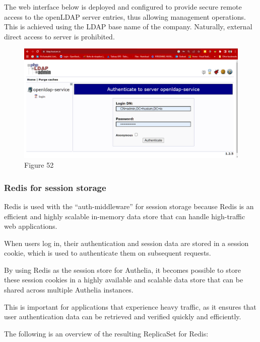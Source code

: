 
The web interface below is deployed and configured to provide secure remote access to the openLDAP server entries, thus allowing management operations. This is achieved using the LDAP base name of the company. Naturally, external direct access to server is prohibited. 
\begin{figure}[H]\centering
\includegraphics[width=1.0\textwidth,angle=00]{assets/f52.png}
\caption{Figure 52 }
\label{fig:f52}
\end{figure} 

\subsubsection{Redis for session storage }

Redis is used with the “auth-middleware” for session storage because Redis is an efficient and highly scalable in-memory data store that can handle high-traffic web applications. 


When users log in, their authentication and session data are stored in a session cookie, which is used to authenticate them on subsequent requests. 

By using Redis as the session store for Authelia, it becomes possible to store these session cookies in a highly available and scalable data store that can be shared across multiple Authelia instances.  

This is important for applications that experience heavy traffic, as it ensures that user authentication data can be retrieved and verified quickly and efficiently. 


The following is an overview of the resulting ReplicaSet for Redis: 

